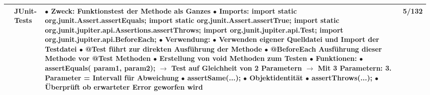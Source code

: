 \documentclass[11pt,a4paper]{article}
\begin{document}
\begin{center}
\begin{longtable}[h]{ | p{2.3cm} | p{2.3cm} | p{12.6cm} | p{1.2cm} | }
	& JUnit-Tests & \makecell[l]{ $\bullet$ Zweck: Funktionstest der Methode als Ganzes \\ $\bullet$ Imports: \\ 
	\hspace{0.4cm} import static org.junit.Assert.assertEquals; \\ \hspace{0.4cm} import static org.junit.Assert.assertTrue; \\
	\hspace{0.4cm} import static org.junit.jupiter.api.Assertions.assertThrows; \\
	\hspace{0.4cm} import org.junit.jupiter.api.Test; \\ \hspace{0.4cm} import org.junit.jupiter.api.BeforeEach; \\ $\bullet$ Verwendung: \\
	\hspace{0.4cm} $\bullet$ Verwenden eigener Quelldatei und Import der Testdatei \\ 
	\hspace{0.4cm} $\bullet$ @Test führt zur direkten Ausführung der Methode \\ 
	\hspace{0.4cm} $\bullet$ @BeforeEach Ausführung dieser Methode vor @Test Methoden \\
	\hspace{0.4cm} $\bullet$ Erstellung von void Methoden zum Testen \\ $\bullet$ Funktionen: \\
	\hspace{0.4cm} $\bullet$ assertEquals( param1, param2); \\ 
	\hspace{0.6cm} $\rightarrow$ Test auf Gleichheit von 2 Parametern \\ 
	\hspace{0.6cm} $\rightarrow$ Mit 3 Parametern: 3. Parameter = Intervall für Abweichung \\ 
	\hspace{0.4cm} $\bullet$ assertSame(...);\\ \hspace{0.6cm} $\bullet$ Objektidentität\\ \hspace{0.4cm} $\bullet$ assertThrows(...); \\ 
	\hspace{0.6cm} $\bullet$ Überprüft ob erwarteter Error geworfen wird} & 5/132 \\
	\hline
	

\end{longtable}
\end{center}
\end{document}

